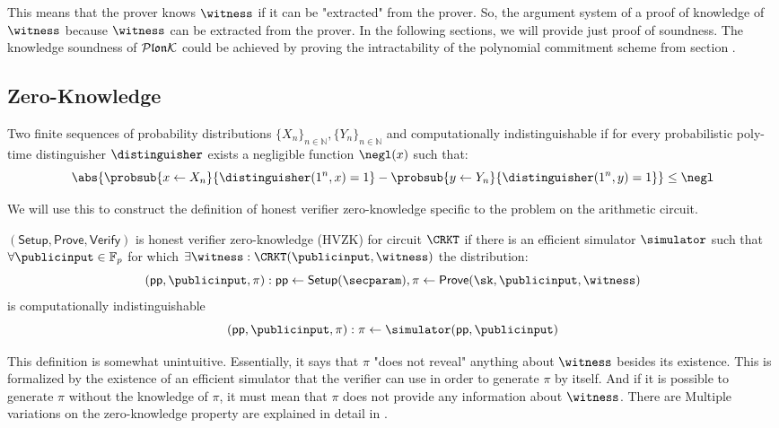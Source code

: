 This means that the prover knows $\witness$ if it can be "extracted" from the prover. So, the argument system of a proof of knowledge of $\witness$ because $\witness$ can be extracted from the prover. In the following sections, we will provide just proof of soundness. The knowledge soundness of $\mathcal{P}\mathfrak{lon}\mathcal{K}$ could be achieved by proving the intractability of the polynomial commitment scheme from section .

\subsection{Zero-Knowledge}
\begin{definition}
\label{hvzk}
    Two finite sequences of probability distributions $\{X_n\}_{n \in \mathbb{N}}, \{Y_n\}_{n \in \mathbb{N}}$ and computationally indistinguishable if for every probabilistic poly-time distinguisher $\distinguisher$ exists a negligible function $\negl(x)$ such that:
    $$\abs{\probsub{x \gets X_n}{\distinguisher(1^n, x) = 1} - \probsub{y \gets Y_n}{\distinguisher(1^n, y) = 1}} \leq \negl$$
\end{definition}

We will use this to construct the definition of honest verifier zero-knowledge specific to the problem on the arithmetic circuit. 

\begin{definition}
    $(\mathsf{Setup}, \mathsf{Prove}, \mathsf{Verify})$ is honest verifier zero-knowledge (HVZK) for circuit $\CRKT$ if there is an efficient simulator $\simulator$ such that $\forall \publicinput \in \field$ for which $\exists \witness: \CRKT(\publicinput, \witness)$ the distribution:
    $$(\publicparameter, \publicinput, \pi): \publicparameter \gets \mathsf{Setup}(\secparam), \pi \gets \mathsf{Prove}(\sk, \publicinput, \witness)$$
    is computationally indistinguishable 
    $$(\publicparameter, \publicinput, \pi): \pi \gets \simulator(\publicparameter, \publicinput)$$
\end{definition}

This definition is somewhat unintuitive. Essentially, it says that $\pi$ "does not reveal" anything about $\witness$ besides its existence. This is formalized by the existence of an efficient simulator that the verifier can use in order to generate $\pi$ by itself. And if it is possible to generate $\pi$ without the knowledge of $\pi$, it must mean that $\pi$ does not provide any information about $\witness$. There are Multiple variations on the zero-knowledge property are explained in detail in \cite{ProofArgsAndZk}.


